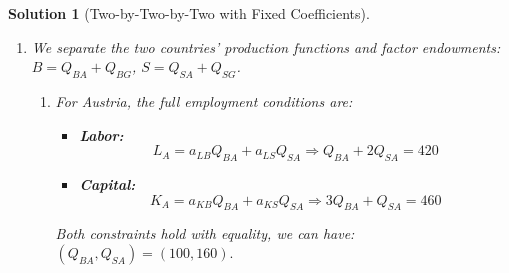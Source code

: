 \documentclass[a4paper,12pt]{article} %
\theoremstyle{nonitalic}
\newtheorem{solution}{Solution}
\begin{document}
\begin{solution}[Two-by-Two-by-Two with Fixed Coefficients]
\begin{enumerate}
        \item[2.] We separate the two countries' production functions and factor endowments: $B = Q_{BA} + Q_{BG}$, $S = Q_{SA} + Q_{SG}$.
        \begin{enumerate}
            \item[(a)] For Austria, the full employment conditions are:
            \begin{itemize}
                \item \textbf{Labor:} 
                \[ L_A = a_{LB} Q_{BA} + a_{LS} Q_{SA} \Rightarrow Q_{BA} + 2 Q_{SA} = 420\]
                \item \textbf{Capital:}
                \[ K_A = a_{KB} Q_{BA} + a_{KS} Q_{SA} \Rightarrow 3 Q_{BA} + Q_{SA} = 460\]
            \end{itemize}
            Both constraints hold with equality, we can have: $(Q_{BA}, Q_{SA}) = (100, 160).$
            \begin{center}
            \end{center}
        

\end{enumerate}
\end{enumerate}
\end{solution}
\end{document}

